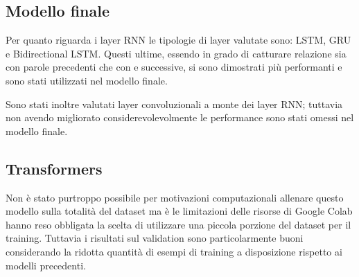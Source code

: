 



\subsection{Modello finale}

Per quanto riguarda i layer RNN le tipologie di layer valutate sono: LSTM, GRU e
Bidirectional LSTM. Questi ultime, essendo in grado di catturare relazione sia
con parole precedenti che con e successive, si sono dimostrati più performanti e
sono stati utilizzati nel modello finale.

Sono stati inoltre valutati layer convoluzionali a monte dei layer RNN; tuttavia
non avendo migliorato considerevolevolmente le performance sono stati omessi nel
modello finale.

\subsection{Transformers}

Non è stato purtroppo possibile per motivazioni computazionali allenare questo
modello sulla totalità del dataset ma è le limitazioni delle risorse di Google
Colab hanno reso obbligata la scelta di utilizzare una piccola porzione del
dataset per il training. Tuttavia i risultati sul validation sono
particolarmente buoni considerando la ridotta quantità di esempi di training a
disposizione rispetto ai modelli precedenti.